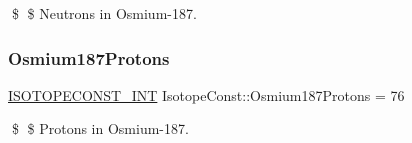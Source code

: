 \$ \$ Neutrons in Osmium-\/187. \mbox{\label{group___isotope_const-_osmium-_os187_ga90c00048ae428fd9b48ce6acc0b8a5c6}} 
\subsubsection{\texorpdfstring{Osmium187\+Protons}{Osmium187Protons}}
{\footnotesize\ttfamily \mbox{\hyperlink{group___isotope_const-_macros_ga5f18360b3e99483a35c32d789e62621c}{I\+S\+O\+T\+O\+P\+E\+C\+O\+N\+S\+T\+\_\+\+I\+NT}} Isotope\+Const\+::\+Osmium187\+Protons = 76}

\$ \$ Protons in Osmium-\/187. 